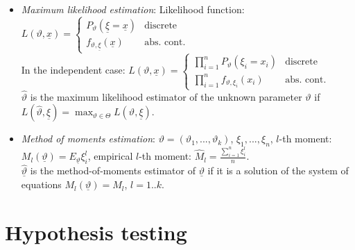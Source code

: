 \documentclass[margin=0px]{article}
\begin{document}
\begin{itemize}
    \item \textit{Maximum likelihood estimation}: Likelihood function: $L(\vartheta, \underline{x}) = \left\{\begin{array} {lr}
                  P_{\vartheta}(\underline{\xi} = \underline{x}) & \text{discrete}      \\
                  f_{\vartheta, \underline{\xi}}(\underline{x})  & \text{abs. cont.}
              \end{array}\right.$ \\
          In the independent case: $L(\vartheta, \underline{x}) = \left\{\begin{array} {lr}
                  \prod_{i=1}^{n}{P_{\vartheta}(\xi_i = x_i)} & \text{discrete}      \\
                  \prod_{i=1}^{n}{f_{\vartheta, \xi_i}(x_i)}  & \text{abs. cont.}
              \end{array}\right.$\\
          $\hat{\vartheta}$ is the maximum likelihood estimator of the unknown parameter $\vartheta$ if $L(\hat{\vartheta},\underline{\xi}) = \max_{\vartheta \in \Theta}{L(\vartheta,\underline{\xi})}$.
    \item \textit{Method of moments estimation}: $\vartheta = (\vartheta_1, ..., \vartheta_k)$, $\xi_1, ..., \xi_n$, $l$-th moment: $M_l(\underline{\vartheta}) = E_{\underline{\vartheta}}\xi_{i}^{l}$, empirical $l$-th moment: $\hat{M}_l = \frac{\sum_{i=1}^{n}{\xi_i^l}}{n}$. \\ $\hat{\underline{\vartheta}}$ is the method-of-moments estimator of $\underline{\vartheta}$ if it is a solution of the system of equations $M_l(\underline{\vartheta}) = \hat{M}_l$, $l=1..k$.
\end{itemize}

\section{Hypothesis testing}
\end{document}
